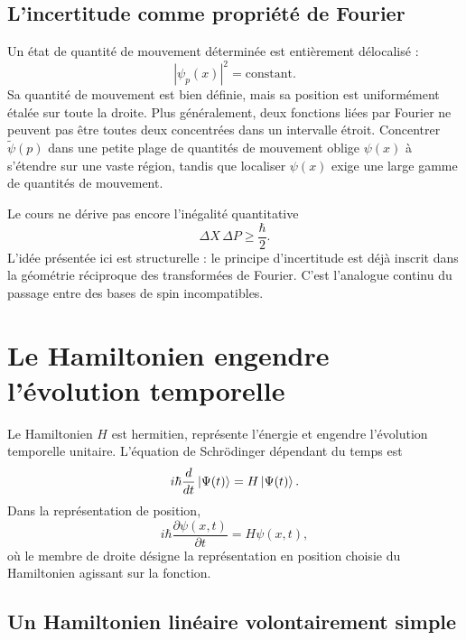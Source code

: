 \subsection{L’incertitude comme propriété de Fourier}

Un état de quantité de mouvement déterminée est entièrement délocalisé :
\begin{equation}
|\psi_p(x)|^2=\text{constant}.
\end{equation}
Sa quantité de mouvement est bien définie, mais sa position est uniformément étalée sur toute la droite. Plus généralement, deux fonctions liées par Fourier ne peuvent pas être toutes deux concentrées dans un intervalle étroit. Concentrer \(\widetilde{\psi}(p)\) dans une petite plage de quantités de mouvement oblige \(\psi(x)\) à s’étendre sur une vaste région, tandis que localiser \(\psi(x)\) exige une large gamme de quantités de mouvement.

Le cours ne dérive pas encore l’inégalité quantitative
\begin{equation}
\Delta X\,\Delta P\geq\frac{\hbar}{2}.
\end{equation}
L’idée présentée ici est structurelle : le principe d’incertitude est déjà inscrit dans la géométrie réciproque des transformées de Fourier. C’est l’analogue continu du passage entre des bases de spin incompatibles.

\section{Le Hamiltonien engendre l’évolution temporelle}

Le Hamiltonien \(H\) est hermitien, représente l’énergie et engendre l’évolution temporelle unitaire. L’équation de Schr\"odinger dépendant du temps est
\begin{equation}
i\hbar\frac{d}{dt}\left\lvert\Psi(t)\right\rangle
=
H\left\lvert\Psi(t)\right\rangle.
\label{eq:l9-abstract-schrodinger}
\end{equation}
Dans la représentation de position,
\begin{equation}
i\hbar\frac{\partial\psi(x,t)}{\partial t}
=
H\psi(x,t),
\label{eq:l9-position-schrodinger}
\end{equation}
où le membre de droite désigne la représentation en position choisie du Hamiltonien agissant sur la fonction.

\subsection{Un Hamiltonien linéaire volontairement simple}

